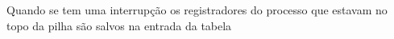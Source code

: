 Quando se tem uma interrupção os registradores do processo que estavam no topo da pilha são salvos na entrada da tabela

